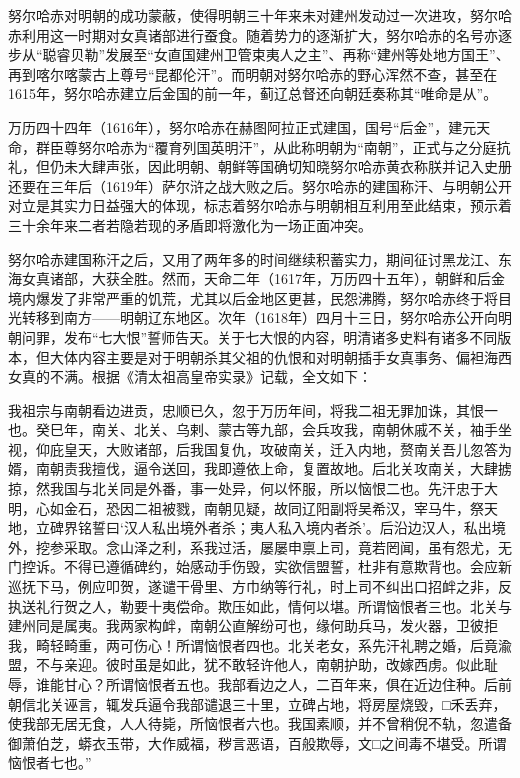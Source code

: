 努尔哈赤对明朝的成功蒙蔽，使得明朝三十年来未对建州发动过一次进攻，努尔哈赤利用这一时期对女真诸部进行蚕食。随着势力的逐渐扩大，努尔哈赤的名号亦逐步从“聪睿贝勒”发展至“女直国建州卫管束夷人之主”、再称“建州等处地方国王”、再到喀尔喀蒙古上尊号“昆都伦汗”。而明朝对努尔哈赤的野心浑然不查，甚至在1615年，努尔哈赤建立后金国的前一年，蓟辽总督还向朝廷奏称其“唯命是从”。

万历四十四年（1616年），努尔哈赤在赫图阿拉正式建国，国号“后金”，建元天命，群臣尊努尔哈赤为“覆育列国英明汗”，从此称明朝为“南朝”，正式与之分庭抗礼，但仍未大肆声张，因此明朝、朝鲜等国确切知晓努尔哈赤黄衣称朕并记入史册还要在三年后（1619年）萨尔浒之战大败之后。努尔哈赤的建国称汗、与明朝公开对立是其实力日益强大的体现，标志着努尔哈赤与明朝相互利用至此结束，预示着三十余年来二者若隐若现的矛盾即将激化为一场正面冲突。

努尔哈赤建国称汗之后，又用了两年多的时间继续积蓄实力，期间征讨黑龙江、东海女真诸部，大获全胜。然而，天命二年（1617年，万历四十五年），朝鲜和后金境内爆发了非常严重的饥荒，尤其以后金地区更甚，民怨沸腾，努尔哈赤终于将目光转移到南方——明朝辽东地区。次年（1618年）四月十三日，努尔哈赤公开向明朝问罪，发布“七大恨”誓师告天。关于七大恨的内容，明清诸多史料有诸多不同版本，但大体内容主要是对于明朝杀其父祖的仇恨和对明朝插手女真事务、偏袒海西女真的不满。根据《清太祖高皇帝实录》记载，全文如下：

我祖宗与南朝看边进贡，忠顺已久，忽于万历年间，将我二祖无罪加诛，其恨一也。癸巳年，南关、北关、乌剌、蒙古等九部，会兵攻我，南朝休戚不关，袖手坐视，仰庇皇天，大败诸部，后我国复仇，攻破南关，迁入内地，赘南关吾儿忽答为婿，南朝责我擅伐，逼令送回，我即遵依上命，复置故地。后北关攻南关，大肆掳掠，然我国与北关同是外番，事一处异，何以怀服，所以恼恨二也。先汗忠于大明，心如金石，恐因二祖被戮，南朝见疑，故同辽阳副将吴希汉，宰马牛，祭天地，立碑界铭誓曰‘汉人私出境外者杀；夷人私入境内者杀’。后沿边汉人，私出境外，挖参采取。念山泽之利，系我过活，屡屡申禀上司，竟若罔闻，虽有怨尤，无门控诉。不得已遵循碑约，始感动手伤毁，实欲信盟誓，杜非有意欺背也。会应新巡抚下马，例应叩贺，遂谴干骨里、方巾纳等行礼，时上司不纠出口招衅之非，反执送礼行贺之人，勒要十夷偿命。欺压如此，情何以堪。所谓恼恨者三也。北关与建州同是属夷。我两家构衅，南朝公直解纷可也，缘何助兵马，发火器，卫彼拒我，畸轻畸重，两可伤心！所谓恼恨者四也。北关老女，系先汗礼聘之婚，后竟渝盟，不与亲迎。彼时虽是如此，犹不敢轻许他人，南朝护助，改嫁西虏。似此耻辱，谁能甘心？所谓恼恨者五也。我部看边之人，二百年来，俱在近边住种。后前朝信北关诬言，辄发兵逼令我部谴退三十里，立碑占地，将房屋烧毁，□禾丢弃，使我部无居无食，人人待毙，所恼恨者六也。我国素顺，并不曾稍倪不轨，忽遣备御萧伯芝，蟒衣玉带，大作威福，秽言恶语，百般欺辱，文□之间毒不堪受。所谓恼恨者七也。”

